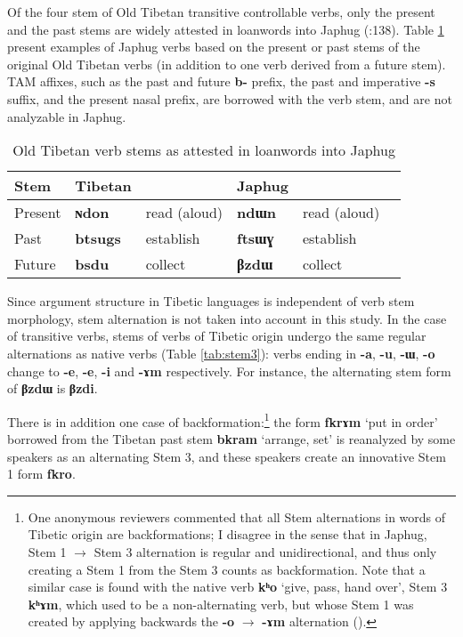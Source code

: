 \documentclass[oneside,a4paper,11pt]{article}
\newcommand{\ipa}[1]{{\phon\textbf{\mbox{#1}}}} %
\begin{document}
Of the four stem of Old Tibetan transitive controllable verbs, only the present and the past stems are widely attested in loanwords into Japhug (\citealt{jacques04these}:138). Table  \ref{tab:four.stems} present examples of Japhug verbs based on the present or past stems of the original Old Tibetan verbs (in addition to one verb derived from a future stem). TAM affixes, such as the past and future \ipa{b-} prefix, the past and imperative \ipa{-s} suffix, and the present nasal prefix, are borrowed with the verb stem, and are not analyzable in Japhug.

\begin{table}[H]
\caption{Old Tibetan verb stems as attested in loanwords into Japhug} \label{tab:four.stems} \centering
\begin{tabular}{llllll}
\toprule
Stem&Tibetan && Japhug &\\
\midrule
Present & \ipa{ɴdon} & read (aloud) & \ipa{ndɯn} & read (aloud)&\\
Past  & \ipa{btsugs} & establish & \ipa{ftsɯɣ} &establish&\\
Future & \ipa{bsdu} & collect & \ipa{βzdɯ} & collect\\
\bottomrule
\end{tabular}
\end{table}

Since argument structure in Tibetic languages is independent of verb stem morphology, stem alternation is not taken into account in this study. In the case of transitive verbs, stems of verbs of Tibetic origin undergo the same regular alternations  as native verbs (Table \ref{tab:stem3}): verbs ending in \ipa{-a}, \ipa{-u}, \ipa{-ɯ}, \ipa{-o} change to \ipa{-e}, \ipa{-e}, \ipa{-i} and \ipa{-ɤm} respectively. For instance, the alternating stem form of \ipa{βzdɯ} is \ipa{βzdi}. 

There is in addition one case of backformation:\footnote{One anonymous reviewers commented that all Stem alternations in words of Tibetic origin are backformations; I disagree in the sense that in Japhug, Stem 1 $\rightarrow$ Stem 3 alternation is regular and unidirectional, and thus only creating a Stem 1 from the Stem 3 counts as backformation. Note that a similar case is found with the native verb \ipa{kʰo} `give, pass, hand over', Stem 3 \ipa{kʰɤm}, which used to be a non-alternating verb, but whose Stem 1 was created by applying backwards the \ipa{-o} $\rightarrow$ \ipa{-ɤm} alternation (\citealt{jacques14esquisse}).} the form \ipa{fkrɤm} `put in order' borrowed from the Tibetan past stem \ipa{bkram} `arrange, set' is reanalyzed by some speakers as an alternating Stem 3, and these speakers create an innovative Stem 1 form \ipa{fkro}. 
\end{document}

